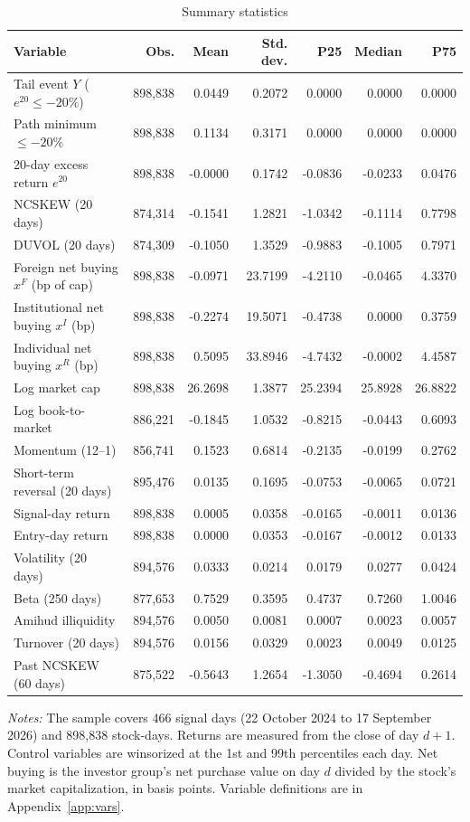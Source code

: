 \begin{table}[htbp]\centering
\caption{Summary statistics}\label{tab:summary}
\footnotesize
\begin{tabular}{lrrrrrr}\toprule
Variable & Obs. & Mean & Std. dev. & P25 & Median & P75 \\\midrule
Tail event $Y$ ($e^{20}\le-20\%$) & 898,838 & 0.0449 & 0.2072 & 0.0000 & 0.0000 & 0.0000 \\
Path minimum $\le-20\%$ & 898,838 & 0.1134 & 0.3171 & 0.0000 & 0.0000 & 0.0000 \\
20-day excess return $e^{20}$ & 898,838 & -0.0000 & 0.1742 & -0.0836 & -0.0233 & 0.0476 \\
NCSKEW (20 days) & 874,314 & -0.1541 & 1.2821 & -1.0342 & -0.1114 & 0.7798 \\
DUVOL (20 days) & 874,309 & -0.1050 & 1.3529 & -0.9883 & -0.1005 & 0.7971 \\
Foreign net buying $x^F$ (bp of cap) & 898,838 & -0.0971 & 23.7199 & -4.2110 & -0.0465 & 4.3370 \\
Institutional net buying $x^I$ (bp) & 898,838 & -0.2274 & 19.5071 & -0.4738 & 0.0000 & 0.3759 \\
Individual net buying $x^R$ (bp) & 898,838 & 0.5095 & 33.8946 & -4.7432 & -0.0002 & 4.4587 \\
Log market cap & 898,838 & 26.2698 & 1.3877 & 25.2394 & 25.8928 & 26.8822 \\
Log book-to-market & 886,221 & -0.1845 & 1.0532 & -0.8215 & -0.0443 & 0.6093 \\
Momentum (12--1) & 856,741 & 0.1523 & 0.6814 & -0.2135 & -0.0199 & 0.2762 \\
Short-term reversal (20 days) & 895,476 & 0.0135 & 0.1695 & -0.0753 & -0.0065 & 0.0721 \\
Signal-day return & 898,838 & 0.0005 & 0.0358 & -0.0165 & -0.0011 & 0.0136 \\
Entry-day return & 898,838 & 0.0000 & 0.0353 & -0.0167 & -0.0012 & 0.0133 \\
Volatility (20 days) & 894,576 & 0.0333 & 0.0214 & 0.0179 & 0.0277 & 0.0424 \\
Beta (250 days) & 877,653 & 0.7529 & 0.3595 & 0.4737 & 0.7260 & 1.0046 \\
Amihud illiquidity & 894,576 & 0.0050 & 0.0081 & 0.0007 & 0.0023 & 0.0057 \\
Turnover (20 days) & 894,576 & 0.0156 & 0.0329 & 0.0023 & 0.0049 & 0.0125 \\
Past NCSKEW (60 days) & 875,522 & -0.5643 & 1.2654 & -1.3050 & -0.4694 & 0.2614 \\
\bottomrule\end{tabular}
\begin{minipage}{0.95\textwidth}\vspace{0.5em}\scriptsize
\textit{Notes:} The sample covers 466 signal days (22 October 2024 to 17 September 2026) and 898,838 stock-days. Returns are measured from the close of day $d+1$. Control variables are winsorized at the 1st and 99th percentiles each day. Net buying is the investor group's net purchase value on day $d$ divided by the stock's market capitalization, in basis points. Variable definitions are in Appendix~\ref{app:vars}.
\end{minipage}\end{table}